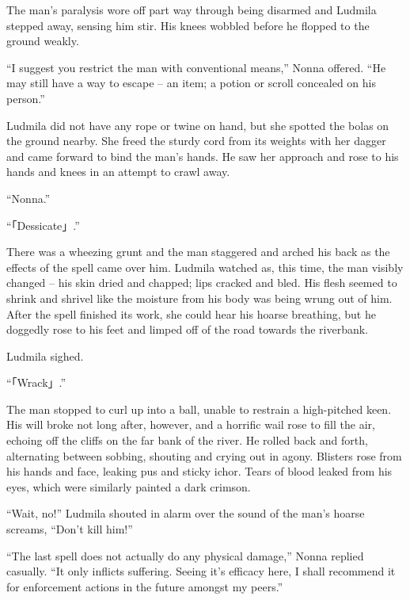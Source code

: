  

The man’s paralysis wore off part way through being disarmed and Ludmila stepped away, sensing him stir. His knees wobbled before he flopped to the ground weakly.

 

“I suggest you restrict the man with conventional means,” Nonna offered. “He may still have a way to escape – an item; a potion or scroll concealed on his person.”

 

Ludmila did not have any rope or twine on hand, but she spotted the bolas on the ground nearby. She freed the sturdy cord from its weights with her dagger and came forward to bind the man’s hands. He saw her approach and rose to his hands and knees in an attempt to crawl away.

 

“Nonna.”

 

“「Dessicate」.”

 

There was a wheezing grunt and the man staggered and arched his back as the effects of the spell came over him. Ludmila watched as, this time, the man visibly changed – his skin dried and chapped; lips cracked and bled. His flesh seemed to shrink and shrivel like the moisture from his body was being wrung out of him. After the spell finished its work, she could hear his hoarse breathing, but he doggedly rose to his feet and limped off of the road towards the riverbank.

 

Ludmila sighed.

 

“「Wrack」.”

 

The man stopped to curl up into a ball, unable to restrain a high-pitched keen. His will broke not long after, however, and a horrific wail rose to fill the air, echoing off the cliffs on the far bank of the river. He rolled back and forth, alternating between sobbing, shouting and crying out in agony. Blisters rose from his hands and face, leaking pus and sticky ichor. Tears of blood leaked from his eyes, which were similarly painted a dark crimson.

 

“Wait, no!” Ludmila shouted in alarm over the sound of the man’s hoarse screams, “Don’t kill him!”

 

“The last spell does not actually do any physical damage,” Nonna replied casually. “It only inflicts suffering. Seeing it’s efficacy here, I shall recommend it for enforcement actions in the future amongst my peers.”

